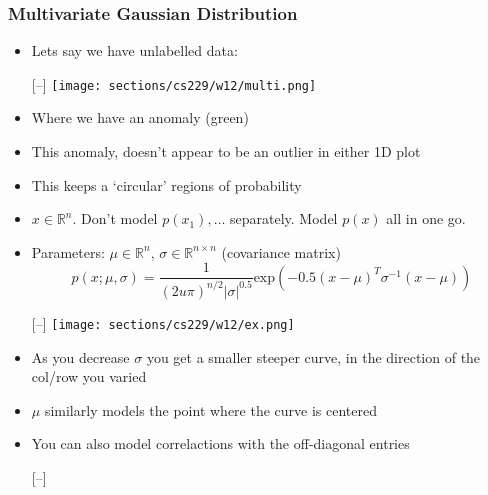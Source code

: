 \subsubsection{Multivariate Gaussian Distribution}
\begin{itemize}[--]
	\item Lets say we have unlabelled data:
	\begin{center}[--]
		\texttt{[image: sections/cs229/w12/multi.png]}
	\end{center}
	\item Where we have an anomaly (green)
	\item This anomaly, doesn't appear to be an outlier in either 1D plot
	\item This keeps a 	`circular' regions of probability
	\item $x\in\mathbb{R}^{n}$. Don't model $p(x_1),\ldots$ separately. Model $p(x)$ all in one go.
	\item Parameters: $\mu\in\mathbb{R}^n$, $\sigma\in\mathbb{R}^{n\times n}$ (covariance matrix)
		$$p(x;\mu, \sigma)=\frac{1}{(2u\pi)^{n/2} |\sigma |^{0.5}} \text{exp} (-0.5 (x-\mu)^T \sigma^{-1} (x-\mu))$$
	\begin{center}[--]
		\texttt{[image: sections/cs229/w12/ex.png]}
	\end{center}
	\item As you decrease $\sigma$ you get a smaller steeper curve, in the direction of the col/row you varied
	\item $\mu$ similarly models the point where the curve is centered
	\item You can also model correlactions with the off-diagonal entries
	\begin{center}[--]
	\end{center}
\end{itemize}

